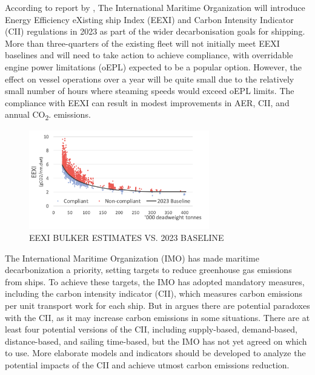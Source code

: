 According to report by \cite{stevenson_2021_bulker}, The International Maritime Organization will introduce Energy Efficiency eXisting ship Index (EEXI) and Carbon Intensity Indicator (CII) regulations in 2023 as part of the wider decarbonisation goals for shipping. More than three-quarters of the existing fleet will not initially meet EEXI baselines and will need to take action to achieve compliance, with overridable engine power limitations (oEPL) expected to be a popular option. However, the effect on vessel operations over a year will be quite small due to the relatively small number of hours where steaming speeds would exceed oEPL limits. The compliance with EEXI can result in modest improvements in AER, CII, and annual CO\textsubscript{2}. emissions.

\begin{figure}[h]
    \centering
    \includegraphics[width=0.7\textwidth]{images/eexi_non_compliant.png}
    \caption{EEXI BULKER ESTIMATES VS. 2023 BASELINE}
    \label{eexiNonCompliant}
\end{figure}


The International Maritime Organization (IMO) has made maritime decarbonization a priority, setting targets to reduce greenhouse gas emissions from ships.
To achieve these targets, the IMO has adopted mandatory measures, including the carbon intensity indicator (CII), which measures carbon emissions per unit transport work for each ship.
But in \cite{WANG2021100005} argues there are potential paradoxes with the CII, as it may increase carbon emissions in some situations.
There are at least four potential versions of the CII, including supply-based, demand-based, distance-based, and sailing time-based, but the IMO has not yet agreed on which to use.
More elaborate models and indicators should be developed to analyze the potential impacts of the CII and achieve utmost carbon emissions reduction.

